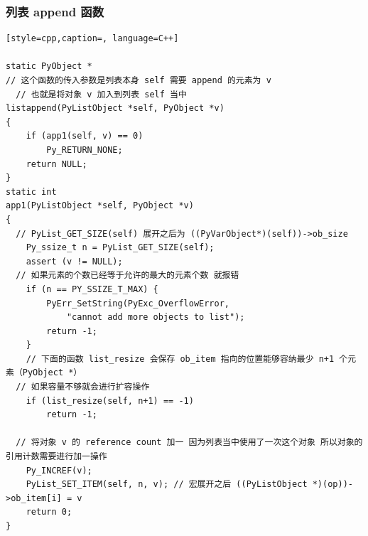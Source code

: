 \subsubsection{列表 append 函数}
\begin{lstlisting}[style=cpp,caption=, language=C++]

static PyObject *
// 这个函数的传入参数是列表本身 self 需要 append 的元素为 v
  // 也就是将对象 v 加入到列表 self 当中
listappend(PyListObject *self, PyObject *v)
{
    if (app1(self, v) == 0)
        Py_RETURN_NONE;
    return NULL;
}
static int
app1(PyListObject *self, PyObject *v)
{
  // PyList_GET_SIZE(self) 展开之后为 ((PyVarObject*)(self))->ob_size
    Py_ssize_t n = PyList_GET_SIZE(self);
    assert (v != NULL);
  // 如果元素的个数已经等于允许的最大的元素个数 就报错
    if (n == PY_SSIZE_T_MAX) {
        PyErr_SetString(PyExc_OverflowError,
            "cannot add more objects to list");
        return -1;
    }
	// 下面的函数 list_resize 会保存 ob_item 指向的位置能够容纳最少 n+1 个元素（PyObject *）
  // 如果容量不够就会进行扩容操作
    if (list_resize(self, n+1) == -1)
        return -1;
		
  // 将对象 v 的 reference count 加一 因为列表当中使用了一次这个对象 所以对象的引用计数需要进行加一操作
    Py_INCREF(v);
    PyList_SET_ITEM(self, n, v); // 宏展开之后 ((PyListObject *)(op))->ob_item[i] = v
    return 0;
}
\end{lstlisting}
